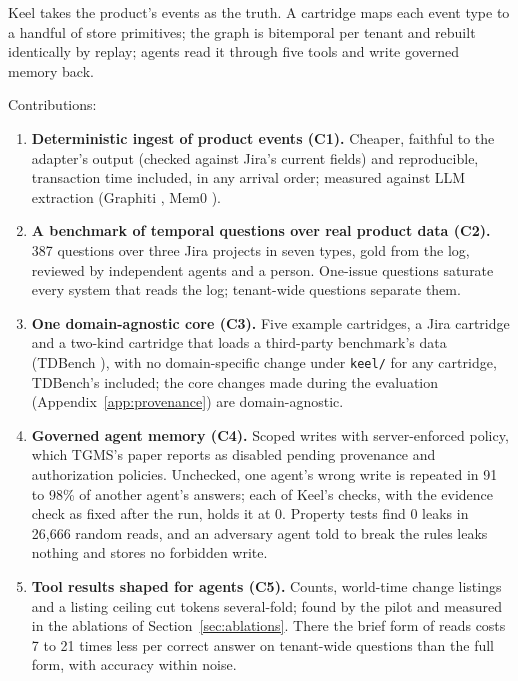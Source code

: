 \documentclass{article}
\newcommand{\code}[1]{\texttt{#1}}
\begin{document}
Keel takes the product's events as the truth. A cartridge maps each event type to a handful of store primitives; the graph is bitemporal per tenant and rebuilt identically by replay; agents read it through five tools and write governed memory back.

Contributions:

\begin{enumerate}[leftmargin=*]
\item \textbf{Deterministic ingest of product events (C1).} Cheaper, faithful to the adapter's output (checked against Jira's current fields) and reproducible, transaction time included, in any arrival order; measured against LLM extraction (Graphiti \cite{zep}, Mem0 \cite{mem0}).
\item \textbf{A benchmark of temporal questions over real product data (C2).} 387 questions over three Jira projects in seven types, gold from the log, reviewed by independent agents and a person. One-issue questions saturate every system that reads the log; tenant-wide questions separate them.
\item \textbf{One domain-agnostic core (C3).} Five example cartridges, a Jira cartridge and a two-kind cartridge that loads a third-party benchmark's data (TDBench \cite{tdbench}), with no domain-specific change under \code{keel/} for any cartridge, TDBench's included; the core changes made during the evaluation (Appendix~\ref{app:provenance}) are domain-agnostic.
\item \textbf{Governed agent memory (C4).} Scoped writes with server-enforced policy, which TGMS's paper \cite{tgms} reports as disabled pending provenance and authorization policies. Unchecked, one agent's wrong write is repeated in 91 to 98\% of another agent's answers; each of Keel's checks, with the evidence check as fixed after the run, holds it at 0. Property tests find 0 leaks in 26,666 random reads, and an adversary agent told to break the rules leaks nothing and stores no forbidden write.
\item \textbf{Tool results shaped for agents (C5).} Counts, world-time change listings and a listing ceiling cut tokens several-fold; found by the pilot and measured in the ablations of Section~\ref{sec:ablations}. There the brief form of reads costs 7 to 21 times less per correct answer on tenant-wide questions than the full form, with accuracy within noise.
\end{enumerate}

\end{document}
